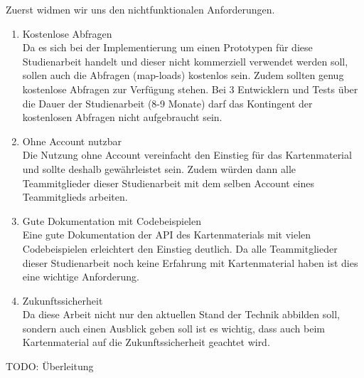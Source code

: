 Zuerst widmen wir uns den nichtfunktionalen Anforderungen.
\begin{enumerate}
\item Kostenlose Abfragen \\
Da es sich bei der Implementierung um einen Prototypen für diese Studienarbeit handelt und dieser nicht kommerziell verwendet werden soll, sollen auch die Abfragen (map-loads) kostenlos sein. Zudem sollten genug kostenlose Abfragen zur Verfügung stehen. Bei 3 Entwicklern und Tests über die Dauer der Studienarbeit (8-9 Monate) darf das Kontingent der kostenlosen Abfragen nicht aufgebraucht sein.

\item Ohne Account nutzbar\\
Die Nutzung ohne Account vereinfacht den Einstieg für das Kartenmaterial und sollte deshalb gewährleistet sein. Zudem würden dann alle Teammitglieder dieser Studienarbeit mit dem selben Account eines Teammitglieds arbeiten. 

\item Gute Dokumentation mit Codebeispielen\\
Eine gute Dokumentation der API des Kartenmaterials mit vielen Codebeispielen erleichtert den Einstieg deutlich. Da alle Teammitglieder dieser Studienarbeit noch keine Erfahrung mit Kartenmaterial haben ist dies eine wichtige Anforderung. 

\item Zukunftssicherheit\\
Da diese Arbeit nicht nur den aktuellen Stand der Technik abbilden soll, sondern auch einen Ausblick geben soll ist es wichtig, dass auch beim Kartenmaterial auf die Zukunftssicherheit geachtet wird.
\end{enumerate}



TODO: Überleitung

